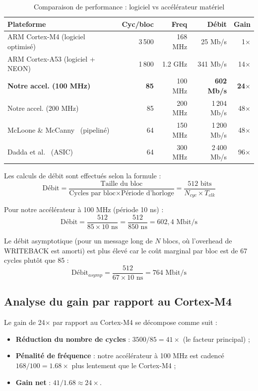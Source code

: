 \begin{table}[H]
\centering
\caption{Comparaison de performance : logiciel vs accélérateur matériel}
\label{tab:perf}
\begin{tabular}{lrrrr}
\toprule
\textbf{Plateforme} & \textbf{Cyc/bloc} & \textbf{Freq} & \textbf{Débit} & \textbf{Gain} \\
\midrule
ARM Cortex-M4 (logiciel optimisé) & 3\,500 & 168 MHz & 25 Mb/s & 1$\times$ \\
ARM Cortex-A53 (logiciel + NEON) & 1\,800 & 1.2 GHz & 341 Mb/s & 14$\times$ \\
\midrule
\textbf{Notre accel. (100 MHz)} & \textbf{85} & 100 MHz & \textbf{602 Mb/s} & \textbf{24$\times$} \\
Notre accel. (200 MHz) & 85 & 200 MHz & 1\,204 Mb/s & 48$\times$ \\
\midrule
McLoone \& McCanny~\cite{mcloone} (pipeliné) & 64 & 150 MHz & 1\,200 Mb/s & 48$\times$ \\
Dadda et al.~\cite{dadda} (ASIC) & 64 & 300 MHz & 2\,400 Mb/s & 96$\times$ \\
\bottomrule
\end{tabular}
\end{table}

Les calculs de débit sont effectués selon la formule :
\[
\text{Débit} = \frac{\text{Taille du bloc}}{\text{Cycles par bloc} \times \text{Période d'horloge}} = \frac{512 \text{ bits}}{N_{cyc} \times T_{clk}}
\]

Pour notre accélérateur à 100 MHz (période 10 ns) :
\[
\text{Débit} = \frac{512}{85 \times 10 \text{ ns}} = \frac{512}{850 \text{ ns}} = 602{,}4 \text{ Mbit/s}
\]

Le débit asymptotique (pour un message long de $N$ blocs, où l'overhead de WRITEBACK est amorti) est plus élevé car le coût marginal par bloc est de 67 cycles plutôt que 85 :
\[
\text{Débit}_{asymp} = \frac{512}{67 \times 10 \text{ ns}} = 764 \text{ Mbit/s}
\]

\subsection{Analyse du gain par rapport au Cortex-M4}

Le gain de 24$\times$ par rapport au Cortex-M4 se décompose comme suit :

\begin{itemize}
    \item \textbf{Réduction du nombre de cycles} : $3500 / 85 = 41\times$ (le facteur principal) ;
    \item \textbf{Pénalité de fréquence} : notre accélérateur à 100 MHz est cadencé $168/100 = 1.68\times$ plus lentement que le Cortex-M4 ;
    \item \textbf{Gain net} : $41 / 1.68 \approx 24\times$.
\end{itemize}

